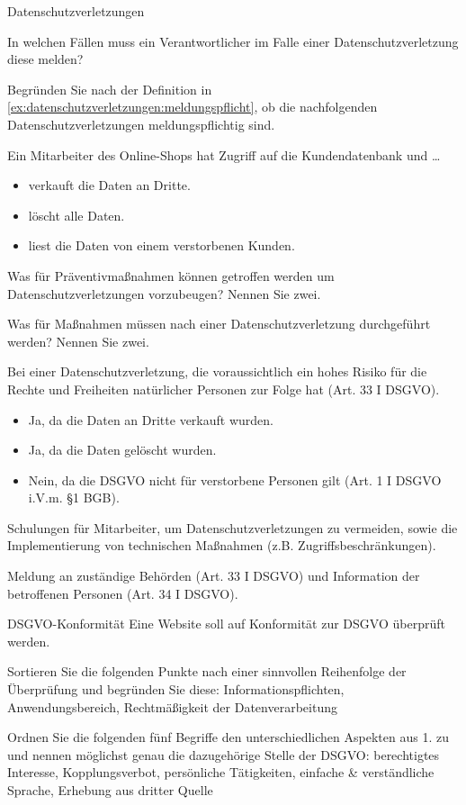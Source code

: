 \documentclass{exercisesheet}
\begin{document}
\begin{exercises}{Datenschutzverletzungen}
\item\label{ex:datenschutzverletzungen:meldungspflicht} In welchen Fällen muss ein Verantwortlicher im Falle einer Datenschutzverletzung diese melden?
\item Begründen Sie nach der Definition in \ref{ex:datenschutzverletzungen:meldungspflicht}, ob die nachfolgenden Datenschutzverletzungen meldungspflichtig sind.\par
Ein Mitarbeiter des Online-Shops hat Zugriff auf die Kundendatenbank und \ldots
\begin{itemize}
  \item verkauft die Daten an Dritte.
  \item löscht alle Daten.
  \item liest die Daten von einem verstorbenen Kunden.
\end{itemize}
\item Was für Präventivmaßnahmen können getroffen werden um Datenschutzverletzungen vorzubeugen? Nennen Sie zwei.
\item Was für Maßnahmen müssen nach einer Datenschutzverletzung durchgeführt werden? Nennen Sie zwei.
\end{exercises}

\begin{solutions}
  \item Bei einer Datenschutzverletzung, die voraussichtlich ein hohes Risiko für die Rechte und Freiheiten natürlicher Personen zur Folge hat (Art. 33 I DSGVO).
  \item
  \begin{itemize}
    \item Ja, da die Daten an Dritte verkauft wurden.
    \item Ja, da die Daten gelöscht wurden.
    \item Nein, da die DSGVO nicht für verstorbene Personen gilt (Art. 1 I DSGVO i.V.m. §1 BGB).
  \end{itemize}
  \item Schulungen für Mitarbeiter, um Datenschutzverletzungen zu vermeiden, sowie die Implementierung von technischen Maßnahmen (z.B. Zugriffsbeschränkungen).
  \item Meldung an zuständige Behörden (Art. 33 I DSGVO) und Information der betroffenen Personen (Art. 34 I DSGVO).
\end{solutions}

\begin{eexercises}{DSGVO-Konformität}{
    Eine Website soll auf Konformität zur DSGVO überprüft werden.
  }
  \item Sortieren Sie die folgenden Punkte nach einer sinnvollen Reihenfolge der Überprüfung und begründen Sie diese: Informationspflichten, Anwendungsbereich, Rechtmäßigkeit der Datenverarbeitung
  \item Ordnen Sie die folgenden fünf Begriffe den unterschiedlichen Aspekten aus 1. zu und nennen möglichst genau die dazugehörige Stelle der DSGVO: berechtigtes Interesse, Kopplungsverbot, persönliche Tätigkeiten, einfache \& verständliche Sprache, Erhebung aus dritter Quelle
\end{eexercises}
\end{document}
